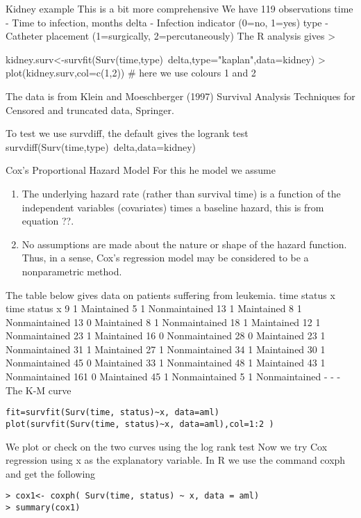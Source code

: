 Kidney example
This is a bit more comprehensive We have 119 observations
time - Time to infection, months
delta - Infection indicator (0=no, 1=yes)
type - Catheter placement (1=surgically, 2=percutaneously)
The R analysis gives
> 

kidney.surv<-survfit(Surv(time,type)~delta,type="kaplan",data=kidney)
> plot(kidney.surv,col=c(1,2)) # here we use colours 1 and 2

The data is from Klein and Moeschberger (1997) Survival Analysis
Techniques for Censored and truncated data, Springer.

To test we use survdiff, the default gives the logrank test
survdiff(Surv(time,type)~delta,data=kidney)

Cox’s Proportional Hazard Model
For this he model we assume
\begin{enumerate}
\item The underlying hazard rate (rather than survival time) is a function of
the independent variables (covariates) times a baseline hazard, this is
from equation ??.
\item No assumptions are made about the nature or shape of the hazard
function. Thus, in a sense, Cox’s regression model may be considered
to be a nonparametric method.
\end{enumerate}

The table below gives data on patients suffering from leukemia.
time status x time status x
9 1 Maintained 5 1 Nonmaintained
13 1 Maintained 8 1 Nonmaintained
13 0 Maintained 8 1 Nonmaintained
18 1 Maintained 12 1 Nonmaintained
23 1 Maintained 16 0 Nonmaintained
28 0 Maintained 23 1 Nonmaintained
31 1 Maintained 27 1 Nonmaintained
34 1 Maintained 30 1 Nonmaintained
45 0 Maintained 33 1 Nonmaintained
48 1 Maintained 43 1 Nonmaintained
161 0 Maintained 45 1 Nonmaintained
5 1 Nonmaintained - - -
The K-M curve
\begin{framed}
\begin{verbatim}
fit=survfit(Surv(time, status)~x, data=aml)
plot(survfit(Surv(time, status)~x, data=aml),col=1:2 )
\end{verbatim}
\end{framed}
We plot or check on the two curves using the log rank test
Now we try Cox regression using x as the explanatory variable. In R we
use the command coxph and get the following
\begin{framed}
\begin{verbatim}
> cox1<- coxph( Surv(time, status) ~ x, data = aml)
> summary(cox1)
\end{verbatim}
\end{framed}
